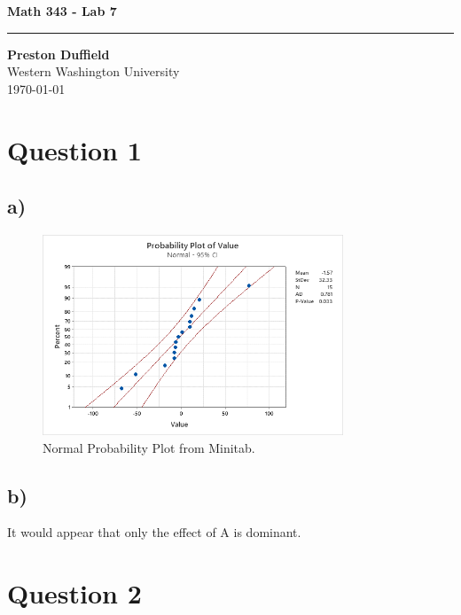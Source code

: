 \documentclass{article}
\begin{document}
\noindent
\begin{minipage}[t]{0.6\textwidth}
    \begin{flushleft}
        \LARGE\textbf{Math 343 - Lab 7} \\
        \vspace{6pt} %
        \hrule width 10cm
        \vspace{12pt}
        \large\textbf{Preston Duffield} \\
        \large Western Washington University \\
        \today
        \vspace{24pt}
    \end{flushleft}
\end{minipage}

\section*{Question 1}
\subsection*{a)}
\begin{figure}[h]
    \centering
    \includegraphics[width=0.8\textwidth]{./images/1_a.png}
    \caption{Normal Probability Plot from Minitab.}
    \label{fig:3_b_2}
\end{figure}

\subsection*{b)}
It would appear that only the effect of A is dominant.

\clearpage
\section*{Question 2}
\end{document}
